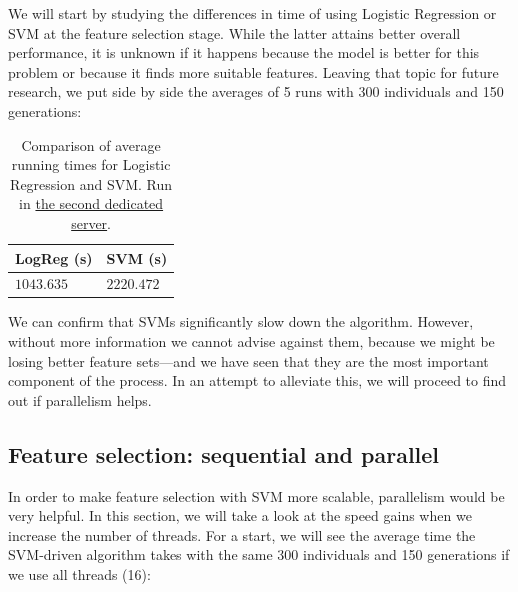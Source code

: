 		We will start by studying the differences in time of using Logistic Regression or \acs{SVM} at the feature selection stage. While the latter attains better overall performance, it is unknown if it happens because the model is better for this problem or because it finds more suitable features. Leaving that topic for future research, we put side by side the averages of 5 runs with 300 individuals and 150 generations:

		\begin{table}[h]

	        \centering
	        \setlength\arrayrulewidth{0.8pt}

	        \begin{tabular}{| >{\centering\arraybackslash}m{0.9in} | >{\centering\arraybackslash}m{0.9in} |}

	            \hline
	            \rowcolor{RoyalBlue}
	            \textbf{LogReg (s)} & \textbf{SVM (s)} \\
	            \hline
	            $1043.635$ & $2220.472$ \\
	            \hline

	        \end{tabular}

	        \caption[Average running times: Logistic Regression versus SVM]{Comparison of average running times for Logistic Regression and SVM. Run in \hyperlink{server:secondserver}{the second dedicated server}.}\label{table:logreg_svm_speed}

	    \end{table}

	    We can confirm that \acs{SVM}s significantly slow down the algorithm. However, without more information we cannot advise against them, because we might be losing better feature sets---and we have seen that they are the most important component of the process. In an attempt to alleviate this, we will proceed to find out if parallelism helps.

	\subsection{Feature selection: sequential and parallel}

		In order to make feature selection with \acs{SVM} more scalable, parallelism would be very helpful. In this section, we will take a look at the speed gains when we increase the number of threads. For a start, we will see the average time the \acs{SVM}-driven algorithm takes with the same 300 individuals and 150 generations if we use all threads (16):

